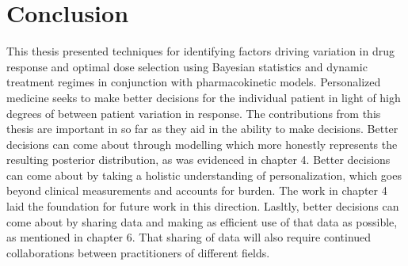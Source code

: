 \section{Conclusion}

This thesis presented techniques for identifying factors driving variation in drug response and optimal dose selection using Bayesian statistics and dynamic treatment regimes in conjunction with pharmacokinetic models.  Personalized medicine seeks to make better decisions for the individual patient in light of high degrees of between patient variation in response.  The contributions from this thesis are important in so far as they aid in the ability to make decisions.  Better decisions can come about through modelling which more honestly represents the resulting posterior distribution, as was evidenced in chapter 4.  Better decisions can come about by taking a holistic understanding of personalization, which goes beyond clinical measurements and accounts for burden.  The work in chapter 4 laid the foundation for future work in this direction.  Lasltly, better decisions can come about by sharing data and making as efficient use of that data as possible, as mentioned in chapter 6. That sharing of data will also require continued collaborations between practitioners of different fields.